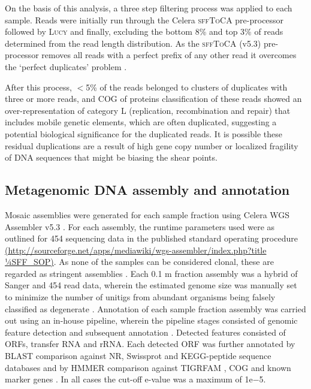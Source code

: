 On the basis of this analysis, a three step filtering process was applied to each sample. 
Reads were initially run through the Celera \textsc{sffToCA} \cite{Miller2008} pre-processor followed by \textsc{Lucy} \cite{Chou2001} and finally, excluding the bottom 8\% and top 3\% of reads determined from the read length distribution. 
As the \textsc{sffToCA} (v5.3) pre-processor removes all reads with a perfect prefix of any other read it overcomes the `perfect duplicates' problem \cite{Gomez-Alvarez2009}.
 
After this process, $<$5\% of the reads belonged to clusters of duplicates with three or more reads, and \ac{COG} of proteins classification of these reads showed an over-representation of category L (replication, recombination and repair) that includes mobile genetic elements, which are often duplicated, suggesting a potential biological significance for the duplicated reads. 
It is possible these residual duplications are a result of high gene copy number or localized fragility of DNA sequences that might be biasing the shear points.

\subsection{Metagenomic DNA assembly and annotation}
Mosaic assemblies were generated for each sample fraction using Celera \ac{WGS} Assembler v5.3 \cite{Myers2000}. 
For each assembly, the runtime parameters used were as outlined for 454 sequencing data in the published standard operating procedure\\ 
\url{(http://sourceforge.net/apps/mediawiki/wgs-assembler/index.php?title 1⁄4SFF\_SOP)}. 
As none of the samples can be considered clonal, these are regarded as stringent assemblies \cite{Rusch2007}. 
Each 0.1 \textmu{}m fraction assembly was a hybrid of Sanger and 454 read data, wherein the estimated genome size was manually set to minimize the number of unitigs from abundant organisms being falsely classified as degenerate \cite{Rusch2007}. 
Annotation of each sample fraction assembly was carried out using an in-house pipeline, wherein the pipeline stages consisted of genomic feature detection and subsequent annotation \cite{DeMaere2011}. 
Detected features consisted of \acp{ORF}, transfer \textsc{RNA} and \ac{rRNA}. 
Each detected \ac{ORF} was further annotated by \ac{BLAST} comparison against \ac{NR}, Swissprot and \ac{KEGG}-peptide sequence databases and by \ac{HMMER} comparison against \ac{TIGRFAM} \cite{Haft2001}, \ac{COG} \cite{Tatusov1997, Tatusov2003} and known marker genes \cite{vonMering2007}.
In all cases the cut-off e-value was a maximum of 1e$-$5. 


